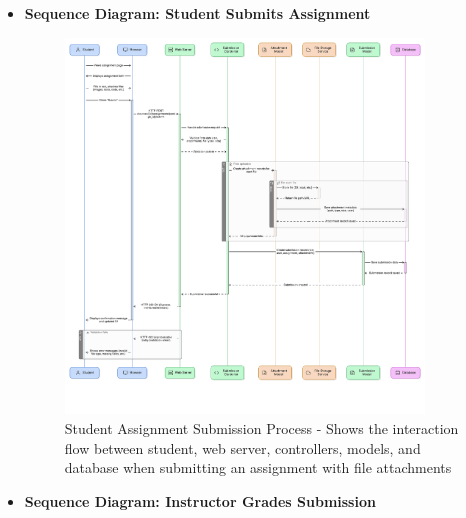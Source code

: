\documentclass[12pt,a4paper]{article}
\begin{document}
\begin{itemize}
    \item \textbf{Sequence Diagram: Student Submits Assignment}
    
    \begin{figure}[!htbp]
        \centering
        \includegraphics[width=0.9\textwidth]{student-submits-assignment.png}
        \caption{Student Assignment Submission Process - Shows the interaction flow between student, web server, controllers, models, and database when submitting an assignment with file attachments}
        \label{fig:student-submits-assignment}
    \end{figure}
    \FloatBarrier

    \item \textbf{Sequence Diagram: Instructor Grades Submission}
    

\end{itemize}
\end{document}
